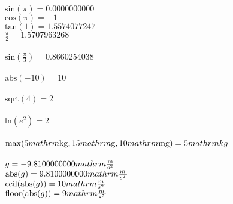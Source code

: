 \documentclass{article}
\begin{document}
\\$\text{sin}(\pi)=0.0000000000$\\
$\text{cos}(\pi)=-1$\\
$\text{tan}(1)=1.5574077247$\\
$\frac{\pi}{2}=1.5707963268$\\
\\$\text{sin}(\frac{\pi}{3})=0.8660254038$\\
\\$\text{abs}(-10)=10$\\
\\$\text{sqrt}(4)=2$\\
\\$\text{ln}(e^{2})=2$\\
\\$\text{max}(5\\mathrm{\mathrm{kg}},15\\mathrm{\mathrm{g}},10\\mathrm{\mathrm{mg}})=5\\mathrm{kg\,}$\\
\\$g=-9.8100000000\\mathrm{\mathrm{\frac{\mathrm{m}}{\mathrm{\mathrm{s}^{2}}}}}$\\
$\text{abs}(g)=9.8100000000\\mathrm{\frac{m\,}{s^{2}\,}}$\\
$\text{ceil}(\text{abs}(g))=10\\mathrm{\frac{m\,}{s^{2}\,}}$\\
$\text{floor}(\text{abs}(g))=9\\mathrm{\frac{m\,}{s^{2}\,}}$\\
\end{document}
